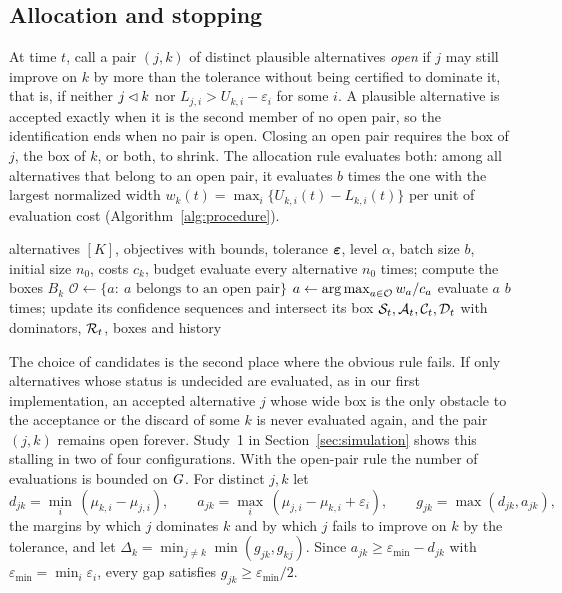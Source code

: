 \subsection{Allocation and stopping}\label{sec:allocation}

At time $t$, call a pair $(j,k)$ of distinct plausible alternatives \emph{open} if $j$ may still improve on $k$ by more than the tolerance without being certified to dominate it, that is, if neither $j\lhd k$ nor $L_{j,i}>U_{k,i}-\varepsilon_i$ for some $i$. A plausible alternative is accepted exactly when it is the second member of no open pair, so the identification ends when no pair is open. Closing an open pair requires the box of $j$, the box of $k$, or both, to shrink. The allocation rule evaluates both: among all alternatives that belong to an open pair, it evaluates $b$ times the one with the largest normalized width $w_k(t)=\max_i\{U_{k,i}(t)-L_{k,i}(t)\}$ per unit of evaluation cost (Algorithm~\ref{alg:procedure}).

\begin{algorithm}[t]
\caption{Anytime-valid Pareto set identification}\label{alg:procedure}
\begin{algorithmic}[1]
\Require alternatives $[K]$, objectives with bounds, tolerance $\bm{\varepsilon}$, level $\alpha$, batch size $b$, initial size $n_0$, costs $c_k$, budget
\State evaluate every alternative $n_0$ times; compute the boxes $B_k$
  \State $\mathcal{O}\gets\{a:\ a\text{ belongs to an open pair}\}$
  \State $a\gets\operatorname*{arg\,max}_{a\in\mathcal{O}} w_a/c_a$ 
  \State evaluate $a$ $b$ times; update its confidence sequences and intersect its box
\EndWhile
\State \Return $\mathcal{S}_t,\mathcal{A}_t,\mathcal{C}_t,\mathcal{D}_t$ with dominators, $\mathcal{R}_t$, boxes and history
\end{algorithmic}
\end{algorithm}

The choice of candidates is the second place where the obvious rule fails. If only alternatives whose status is undecided are evaluated, as in our first implementation, an accepted alternative $j$ whose wide box is the only obstacle to the acceptance or the discard of some $k$ is never evaluated again, and the pair $(j,k)$ remains open forever. Study~1 in Section~\ref{sec:simulation} shows this stalling in two of four configurations. With the open-pair rule the number of evaluations is bounded on $G$. For distinct $j,k$ let
\[
d_{jk}=\min_i\,(\mu_{k,i}-\mu_{j,i}),\qquad a_{jk}=\max_i\,(\mu_{j,i}-\mu_{k,i}+\varepsilon_i),\qquad g_{jk}=\max(d_{jk},a_{jk}),
\]
the margins by which $j$ dominates $k$ and by which $j$ fails to improve on $k$ by the tolerance, and let $\Delta_k=\min_{j\ne k}\min(g_{jk},g_{kj})$. Since $a_{jk}\ge\varepsilon_{\min}-d_{jk}$ with $\varepsilon_{\min}=\min_i\varepsilon_i$, every gap satisfies $g_{jk}\ge\varepsilon_{\min}/2$.

